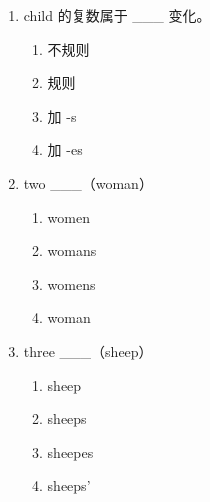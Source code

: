 \documentclass[11pt,a4paper]{ctexart}
\begin{document}
\begin{enumerate}[leftmargin=*,itemsep=4pt]
\item child 的复数属于 \_\_\_ 变化。
\begin{enumerate}[label=\Alph*.,leftmargin=2em,itemsep=1pt,topsep=2pt]
\item 不规则
\item 规则
\item 加 -s
\item 加 -es
\end{enumerate}
\item two \_\_\_（woman）
\begin{enumerate}[label=\Alph*.,leftmargin=2em,itemsep=1pt,topsep=2pt]
\item women
\item womans
\item womens
\item woman
\end{enumerate}
\item three \_\_\_（sheep）
\begin{enumerate}[label=\Alph*.,leftmargin=2em,itemsep=1pt,topsep=2pt]
\item sheep
\item sheeps
\item sheepes
\item sheeps’
\end{enumerate}
\end{enumerate}
\end{document}
